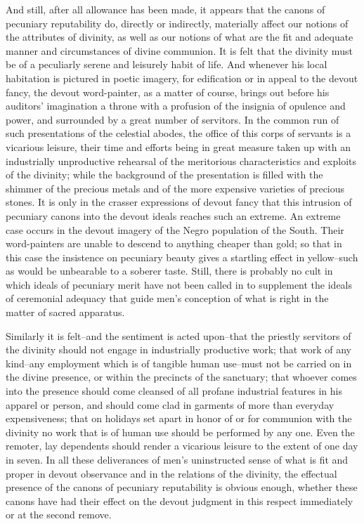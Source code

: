 \documentclass[12pt]{report}
\begin{document}
And still, after all allowance has been made, it appears that the canons
of pecuniary reputability do, directly or indirectly, materially affect
our notions of the attributes of divinity, as well as our notions
of what are the fit and adequate manner and circumstances of divine
communion. It is felt that the divinity must be of a peculiarly serene
and leisurely habit of life. And whenever his local habitation is
pictured in poetic imagery, for edification or in appeal to the devout
fancy, the devout word-painter, as a matter of course, brings out before
his auditors' imagination a throne with a profusion of the insignia of
opulence and power, and surrounded by a great number of servitors. In
the common run of such presentations of the celestial abodes, the office
of this corps of servants is a vicarious leisure, their time and efforts
being in great measure taken up with an industrially unproductive
rehearsal of the meritorious characteristics and exploits of the
divinity; while the background of the presentation is filled with the
shimmer of the precious metals and of the more expensive varieties of
precious stones. It is only in the crasser expressions of devout fancy
that this intrusion of pecuniary canons into the devout ideals reaches
such an extreme. An extreme case occurs in the devout imagery of the
Negro population of the South. Their word-painters are unable to descend
to anything cheaper than gold; so that in this case the insistence on
pecuniary beauty gives a startling effect in yellow--such as would be
unbearable to a soberer taste. Still, there is probably no cult in which
ideals of pecuniary merit have not been called in to supplement the
ideals of ceremonial adequacy that guide men's conception of what is
right in the matter of sacred apparatus.

Similarly it is felt--and the sentiment is acted upon--that the priestly
servitors of the divinity should not engage in industrially productive
work; that work of any kind--any employment which is of tangible human
use--must not be carried on in the divine presence, or within the
precincts of the sanctuary; that whoever comes into the presence should
come cleansed of all profane industrial features in his apparel
or person, and should come clad in garments of more than everyday
expensiveness; that on holidays set apart in honor of or for communion
with the divinity no work that is of human use should be performed by
any one. Even the remoter, lay dependents should render a vicarious
leisure to the extent of one day in seven. In all these deliverances of
men's uninstructed sense of what is fit and proper in devout observance
and in the relations of the divinity, the effectual presence of the
canons of pecuniary reputability is obvious enough, whether these canons
have had their effect on the devout judgment in this respect immediately
or at the second remove.
\end{document}

